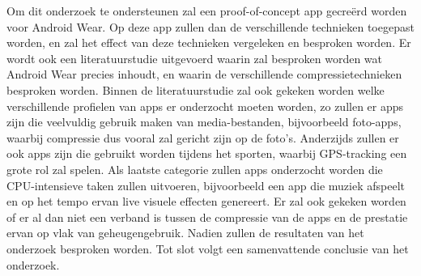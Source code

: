 



Om dit onderzoek te ondersteunen zal een proof-of-concept app gecreërd worden voor Android Wear. Op deze app zullen dan de verschillende technieken toegepast worden, en zal het effect van deze technieken vergeleken en besproken worden. Er wordt ook een literatuurstudie uitgevoerd waarin zal besproken worden wat Android Wear precies inhoudt, en waarin de verschillende compressietechnieken besproken worden. Binnen de literatuurstudie zal ook gekeken worden welke verschillende profielen van apps er onderzocht moeten worden, zo zullen er apps zijn die veelvuldig gebruik maken van media-bestanden, bijvoorbeeld foto-apps, waarbij compressie dus vooral zal gericht zijn op de foto's. Anderzijds zullen er ook apps zijn die gebruikt worden tijdens het sporten, waarbij GPS-tracking een grote rol zal spelen. Als laatste categorie zullen apps onderzocht worden die CPU-intensieve taken zullen uitvoeren, bijvoorbeeld een app die muziek afspeelt en op het tempo ervan live visuele effecten genereert. Er zal ook gekeken worden of er al dan niet een verband is tussen de compressie van de apps en de prestatie ervan op vlak van geheugengebruik. Nadien zullen de resultaten van het onderzoek besproken worden. Tot slot volgt een samenvattende conclusie van het onderzoek. 



